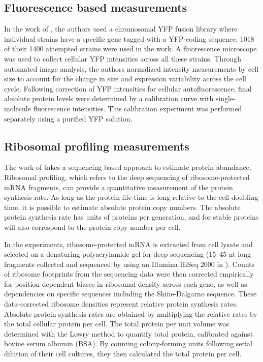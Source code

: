 \subsection{Fluorescence based measurements}
In the work of \cite{taniguchi2010}, the authors used a chromosomal YFP fusion
library where individual strains have a specific gene tagged with a YFP-coding
sequence. 1018 of their 1400 attempted strains were used in the work. A
fluorescence microscope was used to collect cellular YFP intensities across  all
these strains. Through automated image analysis, the authors normalized
intensity measurements by cell size to account for the change in size and
expression variability across the cell cycle. Following correction of  YFP
intensities for cellular autofluorescence, final absolute protein levels were
determined by a calibration curve with single-molecule fluorescence intensities.
This calibration  experiment was performed separately using a purified YFP
solution.

\subsection{Ribosomal profiling measurements}
The work of \cite{li2014} takes a sequencing based approach to estimate protein
abundance. Ribosomal profiling, which refers to the deep sequencing of
ribosome-protected mRNA fragments, can provide a quantitative measurement of the
protein synthesis rate.  As long as the protein life-time is long relative to
the cell doubling time, it is possible to  estimate absolute protein copy
numbers. The absolute protein synthesis rate has units of  proteins per generation,
and for stable proteins will also correspond to the protein  copy number per
cell.

In the experiments, ribosome-protected mRNA is extracted from cell lysate  and
selected on a denaturing polyacrylamide gel for deep sequencing (15–45 nt long
fragments collected and sequenced  by using an Illumina HiSeq 2000 in
\cite{li2014}). Counts of ribosome footprints from the sequencing data were then
corrected empirically for position-dependent biases in ribosomal density across
each gene, as well as dependencies on specific sequences including the
Shine-Dalgarno sequence. These data-corrected ribosome densities represent
relative protein synthesis rates. Absolute protein synthesis rates are obtained
by multiplying the relative rates by the total cellular protein per cell. The
total protein  per unit volume  was determined with the Lowry method to quantify
total protein, calibrated against bovine serum albumin (BSA). By counting
colony-forming units following serial dilution of their cell cultures, they then
calculated the total protein per cell.

